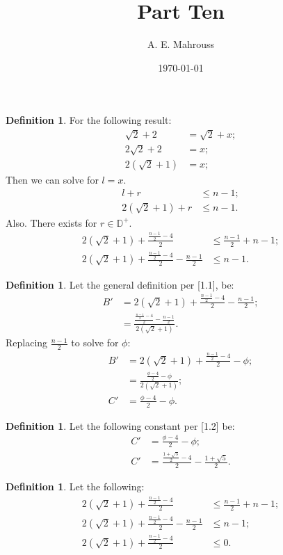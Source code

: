 \documentclass[10pt]{article}
\title{%
	\vspace{-1.5em}%
	\large\textbf{Part Ten}%
}
\author{A. E. Mahrouss}
\date{\today}
\theoremstyle{plain}
\theoremstyle{definition}
\newtheorem{definition}[theorem]{Definition}
\theoremstyle{remark}
\begin{document}
	
	\begin{definition}
		For the following result:
		\begin{align*}
			\sqrt{2}+2&=\sqrt{2} + x;\\
			2\sqrt{2}+2 &=x;\\
			2(\sqrt{2} + 1) &= x;
		\end{align*}
		Then we can solve for $l=x.$
		\begin{align*}
			l + r &\leq n - 1;\\
			2(\sqrt{2} + 1) + r &\leq n - 1.
		\end{align*}
		Also. There exists for $r \in \mathbb{D}^{+}.$
		\begin{align*}
			2(\sqrt{2} + 1) + \frac{\frac{n - 1}{2} - 4}{2}  &\leq \frac{n - 1}{2} + n - 1;\\
			2(\sqrt{2} + 1) + \frac{\frac{n - 1}{2} - 4}{2} - \frac{n - 1}{2} &\leq n - 1.
		\end{align*}
	\end{definition}
	
	\begin{definition}
		Let the general definition per [1.1], be:
		\begin{align*}
			B' &= 2(\sqrt{2} + 1) + \frac{\frac{n - 1}{2} - 4}{2} - \frac{n - 1}{2};\\
			&= \frac{\frac{\frac{n - 1}{2} - 4}{2} - \frac{n - 1}{2}}{2(\sqrt{2} + 1)}.
		\end{align*}
		Replacing $\frac{n - 1}{2}$ to solve for $\phi$:
		\begin{align*}
			B' &= 2(\sqrt{2} + 1) + \frac{\frac{n - 1}{2} - 4}{2} - \phi;\\
			&= \frac{\frac{\phi - 4}{2} - \phi}{2(\sqrt{2} + 1)};\\
			C' &= \frac{\phi - 4}{2} - \phi.
		\end{align*}
	\end{definition}
	
	\begin{definition}
		Let the following constant per [1.2] be:
		\begin{align*}
			C' &= \frac{\phi - 4}{2} - \phi;\\
			C' &= \frac{\frac{1+\sqrt{5}}{2} - 4}{2} - \frac{1+\sqrt{5}}{2}.
		\end{align*}
	\end{definition}
	
	\begin{definition}
		Let the following:
		\begin{align*}
			2(\sqrt{2} + 1) + \frac{\frac{n - 1}{2} - 4}{2}  &\leq \frac{n - 1}{2} + n - 1;\\
			2(\sqrt{2} + 1) + \frac{\frac{n - 1}{2} - 4}{2} - \frac{n - 1}{2} &\leq n - 1;\\
			2(\sqrt{2} + 1) + \frac{\frac{n - 1}{2} - 4}{2} &\leq 0.
		\end{align*}
	\end{definition}
	
\end{document}
